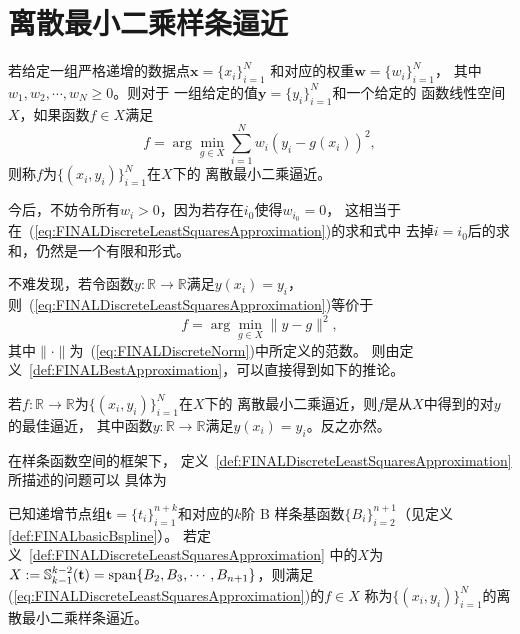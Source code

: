 \cleardoublepage
\section{离散最小二乘样条逼近}
\label{sec:FINALDLSSplinesApproximation}


\begin{defn}
  \label{def:FINALDiscreteLeastSquaresApproximation}
  若给定一组严格递增的数据点$\mathbf{x}=\{x_{i}\}_{i=1}^{N}$
  和对应的权重$\mathbf{w}=\{w_{i}\}_{i=1}^{N}$，
  其中$w_{1},w_{2},\cdots,w_{N}\ge 0$。则对于
  一组给定的值$\mathbf{y}=\{y_{i}\}_{i=1}^{N}$和一个给定的
  函数线性空间$X$，如果函数$f\in X$满足
  \begin{equation}
    \label{eq:FINALDiscreteLeastSquaresApproximation}
    f = \arg\min_{g\in X}\sum_{i=1}^{N}w_{i}(y_{i}-g(x_{i}))^{2},
  \end{equation}
  则称$f$为$\{(x_{i},y_{i})\}_{i=1}^{N}$在$X$下的
  离散最小二乘逼近。
\end{defn}

  今后，不妨令所有$w_{i}>0$，因为若存在$i_{0}$使得$w_{i_{0}}=0$，
  这相当于在~(\ref{eq:FINALDiscreteLeastSquaresApproximation})的求和式中
  去掉$i=i_{0}$后的求和，仍然是一个有限和形式。

  不难发现，若令函数$y:\mathbb{R}\to \mathbb{R}$满足$y(x_{i})=y_{i}$，
  则~(\ref{eq:FINALDiscreteLeastSquaresApproximation})等价于
  \begin{equation}
    \label{eq:FINALDLSAToBest}
    f = \arg\min_{g\in X}\|y-g\|^{2},
  \end{equation}
  其中$\|\cdot\|$为~(\ref{eq:FINALDiscreteNorm})中所定义的范数。
  则由定义~\ref{def:FINALBestApproximation}，可以直接得到如下的推论。

\begin{coro}
  \label{coro:FINALDLSAisEquivToBest}
  若$f:\mathbb{R}\to \mathbb{R}$为$\{(x_{i},y_{i})\}_{i=1}^{N}$在$X$下的
  离散最小二乘逼近，则$f$是从$X$中得到的对$y$的最佳逼近，
  其中函数$y:\mathbb{R}\to \mathbb{R}$满足$y(x_{i})=y_{i}$。反之亦然。
\end{coro}

在样条函数空间的框架下，
定义~\ref{def:FINALDiscreteLeastSquaresApproximation} 所描述的问题可以
具体为
\begin{defn}
  \label{def:FINALDLSSplinesApproximation}
  已知递增节点组$\mathbf{t}=\{t_{i}\}_{i=1}^{n+k}$和对应的$k$阶
  \textnormal{B} 样条基函数$\{B_{i}\}_{i=2}^{n+1}$（见定义 \ref{def:FINALbasicBspline}）。
  若定义~\ref{def:FINALDiscreteLeastSquaresApproximation} 中的$X$为
  $X:=\mathbb{S}_{k-1}^{k-2}(\mathbf{t})
  =\textnormal{span}\{B_{2},B_{3},\cdots,B_{n+1}\}$，则满足
  (\ref{eq:FINALDiscreteLeastSquaresApproximation})的$f\in X$
  称为$\{(x_{i},y_{i})\}_{i=1}^{N}$的离散最小二乘样条逼近。
\end{defn}

